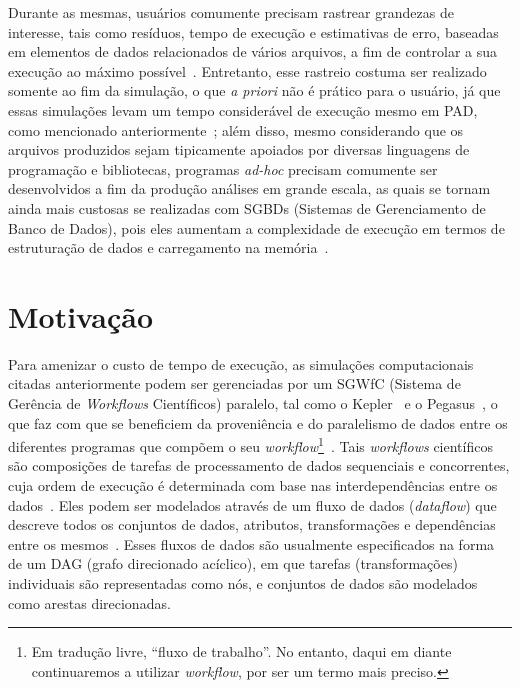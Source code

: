 Durante as mesmas, usuários comumente precisam rastrear grandezas de interesse, tais como resíduos, tempo de execução e estimativas de erro, baseadas em elementos de dados relacionados de vários arquivos, a fim de controlar a sua execução ao máximo possível~\cite{silva2016situ}.
Entretanto, esse rastreio costuma ser realizado somente ao fim da simulação, o que \textit{a priori} não é prático para o usuário, já que essas simulações levam um tempo considerável de execução mesmo em PAD, como mencionado anteriormente~\cite{silva2017raw}; além disso, mesmo considerando que os arquivos produzidos sejam tipicamente apoiados por diversas linguagens de programação e bibliotecas, programas \textit{ad-hoc} precisam comumente ser desenvolvidos a fim da produção análises em grande escala, as quais se tornam ainda mais custosas se realizadas com  SGBDs (Sistemas de Gerenciamento de Banco de Dados), pois eles aumentam a complexidade de execução em termos de estruturação de dados e carregamento na memória~\cite{silva2015analyzing}.

\section{Motivação}

Para amenizar o custo de tempo de execução, as simulações computacionais citadas anteriormente podem ser gerenciadas por um  SGWfC (Sistema de Gerência de \textit{Workflows} Científicos) paralelo, tal como o Kepler~\cite{ludascher2006scientific} e o Pegasus~\cite{deelman2005pegasus}, o que faz com que se beneficiem da proveniência e do paralelismo de dados entre os diferentes programas que compõem o seu \textit{workflow}\footnote{Em tradução livre, ``fluxo de trabalho''. No entanto, daqui em diante continuaremos a utilizar \textit{workflow}, por ser um termo mais preciso.}~\cite{bux2013parallelization}.
Tais \textit{workflows} científicos são composições de tarefas de processamento de dados sequenciais e concorrentes, cuja ordem de execução é determinada com base nas interdependências entre os dados~\cite{bux2013parallelization}. Eles podem ser modelados através de um fluxo de dados (\textit{dataflow}) que descreve todos os conjuntos de dados, atributos, transformações e dependências entre os mesmos~\cite{silva2017raw}. Esses fluxos de dados são usualmente especificados na forma de um  DAG (grafo direcionado acíclico), em que tarefas (transformações) individuais são representadas como nós, e conjuntos de dados são modelados como arestas direcionadas.

